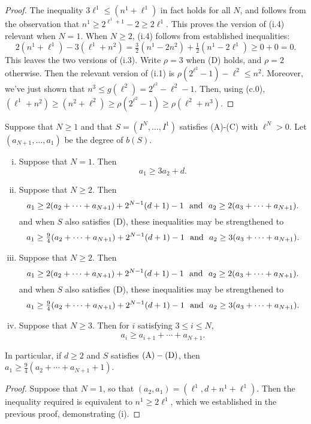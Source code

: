 \documentclass[10pt]{article}
\begin{document}
\begin{KoszulSequenceCombinatorics}
\begin{proof}
The inequality $3\ell^1\leq(n^1+\ell^1)$ in fact holds for all $N$, and follows from the observation that $n^1\geq 2^{\ell^1+1}-2\geq 2\ell^1$. This proves the version of \textup{(i.4)} relevant when $N=1$. When $N\geq2$, \textup{(i.4)} follows from established inequalities:
\[2(n^1+\ell^1)-3(\ell^1+n^2)=\tfrac{3}{2}(n^1-2n^2)+\tfrac{1}{2}(n^1-2\ell^1)\geq0+0=0.\]
This leaves the two versions of \textup{(i.3)}. Write $\rho=3$ when \textup{(D)} holds, and $\rho=2$ otherwise. Then
the relevant version of \textup{(i.1)} is $\rho(2^{\ell^2}-1)-\ell^2\leq n^2$. Moreover, we've just shown that $n^3\leq g(\ell^2)=2^{\ell^2}-\ell^2-1$.
Then, using \textup{(c.0)}, $(\ell^1+n^2)\geq (n^2+\ell^2)\geq\rho(2^{\ell^2}-1)\geq\rho(\ell^2+n^3)$.
\end{proof}
\begin{prop}\label{InequalitiesONai}
Suppose that $N\geq1$ and that $S=(I^N,\ldots,I^1)$ satisfies \textup{(A)}-\textup{(C)} with $\ell^N>0$. Let $(a_{N+1},\ldots,a_1)$ be the degree of $b(S)$.
\begin{enumerate}[i)]
\setlength{\parindent}{.25in}
\squishlist
\item Suppose that $N=1$. Then
\[a_1\geq3a_2+d.\]
\item Suppose that $N\geq2$. Then 
\[a_1\geq2(a_2+\cdots +a_{N+1})+2^{N-1}(d+1)-1\textup{ \ and \ }a_2\geq2(a_3+\cdots +a_{N+1}).\]
and when $S$ also satisfies \textup{(D)}, these inequalities may be strengthened to
\[a_1\geq\tfrac{9}{4}(a_2+\cdots +a_{N+1})+2^{N-1}(d+1)-1\textup{ \ and \ }a_2\geq3(a_3+\cdots +a_{N+1}).\]


\item Suppose that $N\geq2$. Then 
\[a_1\geq2(a_2+\cdots +a_{N+1})+2^{N-1}(d+1)-1\textup{ \ and \ }a_2\geq2(a_3+\cdots +a_{N+1}).\]
and when $S$ also satisfies \textup{(D)}, these inequalities may be strengthened to
\[a_1\geq\tfrac{9}{4}(a_2+\cdots +a_{N+1})+2^{N-1}(d+1)-1\textup{ \ and \ }a_2\geq3(a_3+\cdots +a_{N+1}).\]


\item Suppose that $N\geq3$. Then for $i$ satisfying $3\leq i\leq N$,
\[a_i\geq a_{i+1}+\cdots +a_{N+1}.\]
\end{enumerate}
In particular, if $d\geq2$ and $S$ satisfies $\textup{(A)}-\textup{(D)}$, then $a_1\geq\tfrac{9}{4}(a_2+\cdots +a_{N+1}+1)$.
\end{prop}
\begin{proof}
Suppose that $N=1$, so that $(a_2,a_1)=(\ell^1,d+n^1+\ell^1)$. Then the inequality required is equivalent to $n^1\geq2\ell^1$, which we established in the previous proof, demonstrating (i).


\end{proof}
\end{KoszulSequenceCombinatorics}
\end{document}
